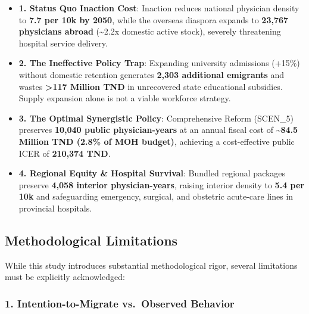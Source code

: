 \documentclass[
  11pt,
  a4paper]{article}
\providecommand{\tightlist}{%
  \setlength{\itemsep}{0pt}\setlength{\parskip}{0pt}}
\begin{document}
\begin{tcolorbox}[enhanced jigsaw, arc=.35mm, bottomrule=.15mm, bottomtitle=1mm, breakable, colback=white, colbacktitle=quarto-callout-note-color!10!white, colframe=quarto-callout-note-color-frame, coltitle=black, left=2mm, leftrule=.75mm, opacityback=0, opacitybacktitle=0.6, rightrule=.15mm, title={Executive Policy Brief: Core Takeaways for the Ministries of Health and
Finance}, titlerule=0mm, toprule=.15mm, toptitle=1mm]

\begin{itemize}
\tightlist
\item
  \textbf{1. Status Quo Inaction Cost}: Inaction reduces national
  physician density to \textbf{7.7 per 10k by 2050}, while the overseas
  diaspora expands to \textbf{23,767 physicians abroad}
  (\textasciitilde2.2x domestic active stock), severely threatening
  hospital service delivery.
\item
  \textbf{2. The Ineffective Policy Trap}: Expanding university
  admissions (+15\%) without domestic retention generates \textbf{2,303
  additional emigrants} and wastes \textbf{\textgreater117 Million TND}
  in unrecovered state educational subsidies. Supply expansion alone is
  not a viable workforce strategy.
\item
  \textbf{3. The Optimal Synergistic Policy}: Comprehensive Reform
  (SCEN\_5) preserves \textbf{10,040 public physician-years} at an
  annual fiscal cost of \textbf{\textasciitilde84.5 Million TND (2.8\%
  of MOH budget)}, achieving a cost-effective public ICER of
  \textbf{210,374 TND}.
\item
  \textbf{4. Regional Equity \& Hospital Survival}: Bundled regional
  packages preserve \textbf{4,058 interior physician-years}, raising
  interior density to \textbf{5.4 per 10k} and safeguarding emergency,
  surgical, and obstetric acute-care lines in provincial hospitals.
\end{itemize}

\end{tcolorbox}

\subsection{Methodological
Limitations}\label{sec-discussion-limitations}

While this study introduces substantial methodological rigor, several
limitations must be explicitly acknowledged:

\subsubsection{1. Intention-to-Migrate vs.~Observed
Behavior}\label{intention-to-migrate-vs.-observed-behavior}
\end{document}

